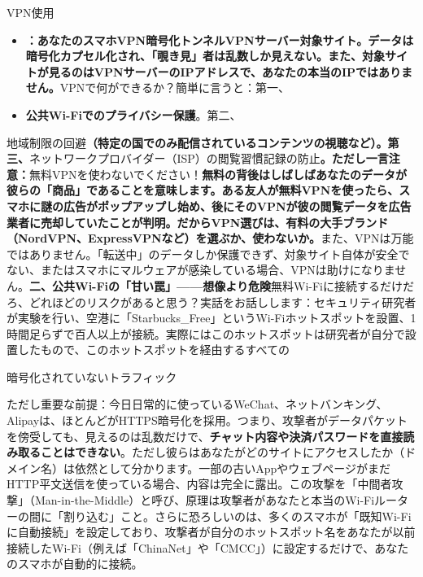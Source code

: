 


VPN使用

\begin{itemize}
  \item \textbf{：あなたのスマホVPN暗号化トンネルVPNサーバー対象サイト。データは暗号化カプセル化され、「覗き見」者は乱数しか見えない。また、対象サイトが見るのはVPNサーバーのIPアドレスで、あなたの本当のIPではありません。}VPNで何ができるか？簡単に言うと：第一、
  \item \textbf{公共Wi-Fiでのプライバシー保護}。第二、
\end{itemize}

地域制限の回避\textbf{（特定の国でのみ配信されているコンテンツの視聴など）。第三、}ネットワークプロバイダー（ISP）の閲覧習慣記録の防止\textbf{。ただし一言注意：}無料VPNを使わないでください！\textbf{無料の背後はしばしばあなたのデータが彼らの「商品」であることを意味します。ある友人が無料VPNを使ったら、スマホに謎の広告がポップアップし始め、後にそのVPNが彼の閲覧データを広告業者に売却していたことが判明。だからVPN選びは、有料の大手ブランド（NordVPN、ExpressVPNなど）を選ぶか、使わないか。}また、VPNは万能ではありません。「転送中」のデータしか保護できず、対象サイト自体が安全でない、またはスマホにマルウェアが感染している場合、VPNは助けになりません。\textbf{二、公共Wi-Fiの「甘い罠」——想像より危険}無料Wi-Fiに接続するだけだろ、どれほどのリスクがあると思う？実話をお話しします：セキュリティ研究者が実験を行い、空港に「Starbucks\_Free」というWi-Fiホットスポットを設置、1時間足らずで百人以上が接続。実際にはこのホットスポットは研究者が自分で設置したもので、このホットスポットを経由するすべての

暗号化されていないトラフィック


ただし重要な前提：今日日常的に使っているWeChat、ネットバンキング、Alipayは、ほとんどがHTTPS暗号化を採用。つまり、攻撃者がデータパケットを傍受しても、見えるのは乱数だけで、\textbf{チャット内容や決済パスワードを直接読み取ることはできない}。ただし彼らはあなたがどのサイトにアクセスしたか（ドメイン名）は依然として分かります。一部の古いAppやウェブページがまだHTTP平文送信を使っている場合、内容は完全に露出。この攻撃を「中間者攻撃」（Man-in-the-Middle）と呼び、原理は攻撃者があなたと本当のWi-Fiルーターの間に「割り込む」こと。さらに恐ろしいのは、多くのスマホが「既知Wi-Fiに自動接続」を設定しており、攻撃者が自分のホットスポット名をあなたが以前接続したWi-Fi（例えば「ChinaNet」や「CMCC」）に設定するだけで、あなたのスマホが自動的に接続。

